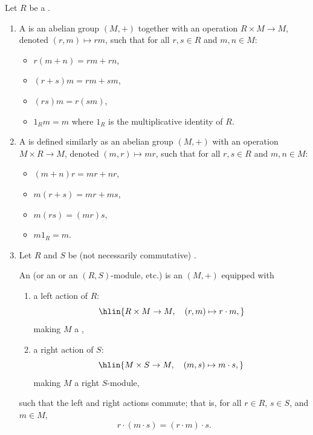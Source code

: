 \begin{definition} \label{definition:module_of_a_ring}
Let $R$ be a . 
\begin{enumerate}
    \item A  is an abelian group $(M,+)$ together with an operation $R \times M \to M$, denoted $(r,m) \mapsto rm$, such that for all $r,s \in R$ and $m,n \in M$:
    \begin{itemize}
        \item $r(m+n) = rm + rn$,
        \item $(r+s)m = rm + sm$,
        \item $(rs)m = r(sm)$,
        \item $1_R m = m$ where $1_R$ is the multiplicative identity of $R$.
    \end{itemize}

    \item A  is defined similarly as an abelian group $(M,+)$ with an operation $M \times R \to M$, denoted $(m,r) \mapsto mr$, such that for all $r,s \in R$ and $m,n \in M$:
    \begin{itemize}
        \item $(m+n)r = mr + nr$,
        \item $m(r+s) = mr + ms$,
        \item $m(rs) = (mr)s$,
        \item $m 1_R = m$.
    \end{itemize}

    \item Let $R$ and $S$ be  (not necessarily commutative) .

    An  (or an  or an $(R,S)$-module, etc.) is an  $(M,+)$ equipped with
    \begin{enumerate}
        \item a left action of $R$:
        $$\hlin{R \times M \to M, \quad (r,m) \mapsto r \cdot m,}$$
        making $M$ a ,
        \item a right action of $S$:
        $$\hlin{M \times S \to M, \quad (m,s) \mapsto m \cdot s,}$$
        making $M$ a right $S$-module,
    \end{enumerate}
    such that the left and right actions commute; that is, for all $r \in R$, $s \in S$, and $m \in M$,
    $$ r \cdot (m \cdot s) = (r \cdot m) \cdot s.  $$


\end{enumerate}
\end{definition}
